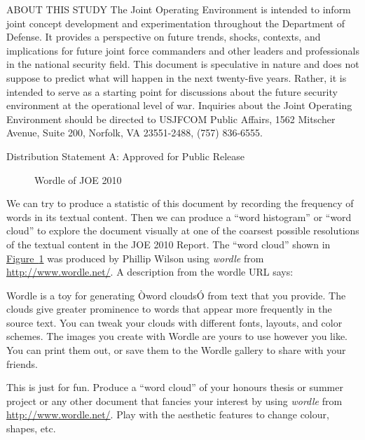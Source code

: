 {\small
ABOUT THIS STUDY The Joint Operating Environment is intended to inform joint concept development and experimentation throughout the Department of Defense. It provides a perspective on future trends, shocks, contexts, and implications for future joint force commanders and other leaders and professionals in the national security field. This document is speculative in nature and does not suppose to predict what will happen in the next twenty-five years. Rather, it is intended to serve as a starting point for discussions about the future security environment at the operational level of war. Inquiries about the Joint Operating Environment should be directed to USJFCOM Public Affairs, 1562 Mitscher Avenue, Suite 200, Norfolk, VA 23551-2488, (757) 836-6555. 

Distribution Statement A: Approved for Public Release
}

\begin{figure}[htpb]
\caption{Wordle of JOE 2010\label{F:joe_vs_wordle}}
\centering   {}
\end{figure}

We can try to produce a statistic of this document by recording the frequency of words in its textual content. Then we can produce a ``word histogram'' or ``word cloud'' to explore the document visually at one of the coarsest possible resolutions of the textual content in the JOE 2010 Report.  The ``word cloud'' shown in \hyperref[F:joe_vs_wordle]{Figure~\ref*{F:joe_vs_wordle}} was produced by Phillip Wilson using {\em wordle} from \href{http://www.wordle.net/}{\url{http://www.wordle.net/}}.  A description from the wordle URL says:

{\small
Wordle is a toy for generating Òword cloudsÓ from text that you provide. The clouds give greater prominence to words that appear more frequently in the source text. You can tweak your clouds with different fonts, layouts, and color schemes. The images you create with Wordle are yours to use however you like. You can print them out, or save them to the Wordle gallery to share with your friends.
}

\begin{labwork}\label{LW:JoeWordle}  This is just for fun.  Produce a ``word cloud'' of your honours thesis or summer project or any other document that fancies your interest by using {\em wordle} from \href{http://www.wordle.net/}{\url{http://www.wordle.net/}}. Play with the aesthetic features to change colour, shapes, etc.\end{labwork}

